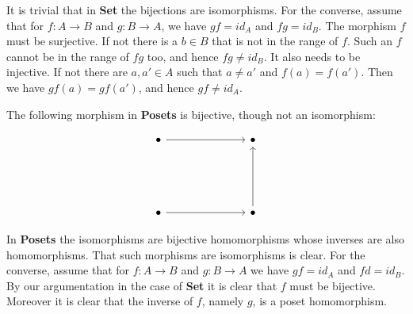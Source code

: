 It is trivial that in \textbf{Set} the bijections are isomorphisms. For the converse, assume that for $f:A\to B$ and $g:B\to A$, we have $gf=id_A$ and $fg=id_B$. The morphism $f$ must be surjective. If not there is a $b\in B$ that is not in the range of $f$. Such an $f$ cannot be in the range of $fg$ too, and hence $fg\neq id_B$. It also needs to be injective. If not there are $a,a'\in A$ such that $a\neq a'$ and $f(a)=f(a')$. Then we have $gf(a)=gf(a')$, and hence $gf\neq id_A$.

The following morphism in \textbf{Posets} is bijective, though not an isomorphism:

\[\begin{tikzcd}
	\bullet &&& \bullet \\
	\\
	\\
	\bullet &&& \bullet
	\arrow[from=4-4, to=1-4]
	\arrow[from=1-1, to=1-4]
	\arrow[from=4-1, to=4-4]
\end{tikzcd}\]

In \textbf{Posets} the isomorphisms are bijective homomorphisms whose inverses are also homomorphisms. That such morphisms are isomorphisms is clear. For the converse, assume that for $f:A\to B$ and $g:B\to A$ we have $gf=id_A$ and $fd=id_B$. By our argumentation in the case of \textbf{Set} it is clear that $f$ must be bijective. Moreover it is clear that the inverse of $f$, namely $g$, is a poset homomorphism.
